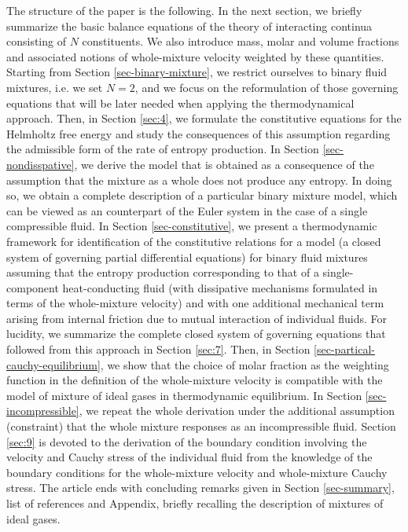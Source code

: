 \documentclass[a4paper]{article}
\begin{document}
The structure of the paper is the following. In the next section, we briefly summarize the basic balance equations of the theory of interacting continua consisting of $N$ constituents. We also introduce mass, molar and volume fractions and associated notions of whole-mixture velocity weighted by these quantities. Starting from Section \ref{sec-binary-mixture}, we restrict ourselves to binary fluid mixtures, i.e. we set $N{=}2$, and we focus on the reformulation of those governing equations that will be later needed when applying the thermodynamical approach. Then, in Section \ref{sec:4}, we formulate the constitutive equations for the Helmholtz free energy and study the consequences of this assumption regarding the admissible form of the rate of entropy production. In Section \ref{sec-nondisspative},  we derive the model that is obtained as a consequence of the assumption that the mixture as a whole does not produce any entropy. In doing so, we obtain a complete description of a particular binary mixture model, which can be viewed as an counterpart of the Euler system in the case of a single compressible fluid. In Section \ref{sec-constitutive}, we present a thermodynamic framework for identification of the constitutive relations for a model (a closed system of governing partial differential equations) for binary fluid mixtures assuming that the entropy production corresponding to that of a single-component heat-conducting fluid (with dissipative mechanisms formulated in terms of the whole-mixture velocity) and with one additional mechanical term arising from internal friction due to mutual interaction of individual fluids. For lucidity, we summarize the complete closed system of governing equations that followed from this approach in Section \ref{sec:7}. 
Then, in Section \ref{sec-partical-cauchy-equilibrium}, we show that the choice of molar fraction as the weighting function in the definition of the whole-mixture velocity is compatible with the model of mixture of ideal gases in thermodynamic equilibrium. In Section \ref{sec-incompressible}, we repeat the whole derivation under the additional assumption (constraint) that the whole mixture responses as an incompressible fluid. Section \ref{sec:9} is devoted to the derivation of the boundary condition involving the velocity and Cauchy stress of the individual fluid from the knowledge of the boundary conditions for the whole-mixture velocity and whole-mixture Cauchy stress. The article ends with concluding remarks given in Section \ref{sec-summary}, list of references and Appendix, briefly recalling the description of mixtures of ideal gases.
\end{document}
